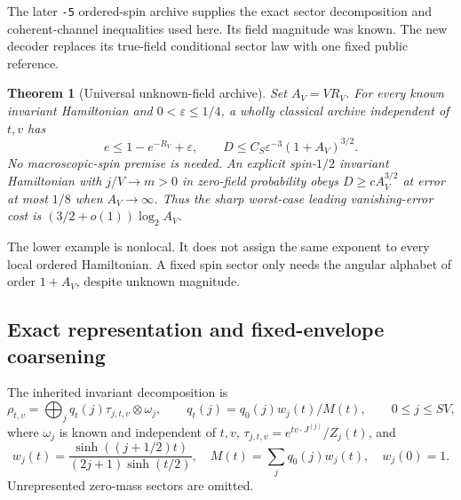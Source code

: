 \documentclass[11pt]{article}
\newtheorem{theorem}{Theorem}[section]
\theoremstyle{definition}
\newcommand{\eps}{\varepsilon}
\begin{document}
The later \texttt{-5} ordered-spin archive supplies the exact sector
decomposition and coherent-channel inequalities used here. Its field
magnitude was known. The new decoder replaces its true-field
conditional sector law with one fixed public reference.

\begin{theorem}[Universal unknown-field archive]\label{thm:field}
Set $A_V=VR_V$. For every known invariant Hamiltonian and
$0<\eps\le1/4$, a wholly classical archive independent of $t,v$ has
\begin{equation}\label{eq:fieldupper}
 e\le1-e^{-R_V}+\eps,\qquad
 D\le C_S\eps^{-3}(1+A_V)^{3/2}.
\end{equation}
No macroscopic-spin premise is needed.
An explicit spin-$1/2$ invariant Hamiltonian with
$j/V\to m>0$ in zero-field probability obeys
$D\ge cA_V^{3/2}$ at error at most $1/8$ when $A_V\to\infty$.
Thus the sharp worst-case leading vanishing-error cost is
$(3/2+o(1))\log_2 A_V$.
\end{theorem}

The lower example is nonlocal. It does not assign the same exponent to
every local ordered Hamiltonian. A fixed spin sector only needs the
angular alphabet of order $1+A_V$, despite unknown magnitude.

\subsection{Exact representation and fixed-envelope coarsening}
The inherited invariant decomposition is
\begin{equation}\label{eq:sector}
 \rho_{t,v}=\bigoplus_jq_t(j)\tau_{j,t,v}\otimes\omega_j,\qquad
 q_t(j)=q_0(j)w_j(t)/M(t),\qquad 0\le j\le SV,
\end{equation}
where $\omega_j$ is known and independent of $t,v$,
$\tau_{j,t,v}=e^{t v\cdot J^{(j)}}/Z_j(t)$, and
\[
 w_j(t)=\frac{\sinh((j+1/2)t)}{(2j+1)\sinh(t/2)},\quad
 M(t)=\sum_jq_0(j)w_j(t),\quad w_j(0)=1.
\]
Unrepresented zero-mass sectors are omitted.
\end{document}
